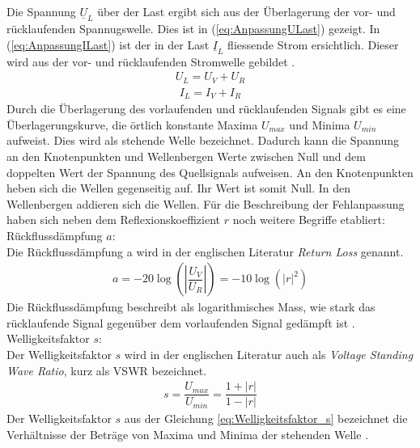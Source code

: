 Die Spannung $\underline{U}_L$ über der Last ergibt sich  aus der Überlagerung der vor- und  rücklaufenden Spannugswelle. Dies ist in   (\ref{eq:AnpassungULast}) gezeigt. In  (\ref{eq:AnpassungILast}) ist der in der Last $\underline{I}_L$  fliessende Strom ersichtlich. Dieser wird aus der vor- und rücklaufenden Stromwelle gebildet \cite{Tekom}.
\begin{eqnarray}\label{eq:AnpassungULast}
U_L =U_V +U_R
\end{eqnarray}
\begin{eqnarray}\label{eq:AnpassungILast}
I_L = I_V + I_R
\end{eqnarray}
Durch die Überlagerung des vorlaufenden und rücklaufenden Signals gibt es eine Überlagerungskurve, die örtlich konstante Maxima $U_{max}$ und Minima $U_{min}$ aufweist. Dies wird als stehende Welle bezeichnet. Dadurch kann die Spannung an den Knotenpunkten und Wellenbergen Werte zwischen Null und dem doppelten Wert der Spannung des Quellsignals aufweisen. An den Knotenpunkten heben sich die Wellen gegenseitig auf. Ihr Wert ist somit Null. In den Wellenbergen addieren sich die Wellen. Für die Beschreibung der Fehlanpassung haben sich neben dem Reflexionskoeffizient  $r$ noch weitere Begriffe etabliert:\\
\newpage
Rückflussdämpfung $a$:\\
Die Rückflussdämpfung a wird in der englischen Literatur \textit{Return Loss} genannt.
\begin{eqnarray}\label{eq:Ruckflussdämpfung_a}
a=-20\log\left(\left| \dfrac{U_V}{U_R}\right| \right)=-10\log(|r|^{2})
\end{eqnarray}
Die Rückflussdämpfung beschreibt als logarithmisches Mass, wie stark das rücklaufende Signal gegenüber dem vorlaufenden Signal gedämpft ist \cite{Tekom}.\\


Welligkeitsfaktor $s$:\\
Der Welligkeitsfaktor $s$ wird in der englischen Literatur auch als \textit{Voltage Standing Wave Ratio}, kurz als VSWR bezeichnet.
\begin{eqnarray}\label{eq:Welligkeitsfaktor_s}
s=\dfrac{U_{max}}{U_{min}}=\dfrac{1+|r|}{1-|r|}
\end{eqnarray}
Der Welligkeitsfaktor $s$ aus der Gleichung \ref{eq:Welligkeitsfaktor_s} bezeichnet die Verhältnisse der Beträge von Maxima und Minima der stehenden Welle \cite{Tekom}.\\

